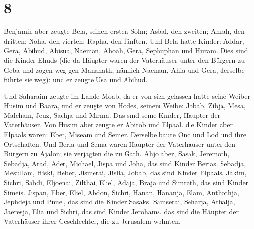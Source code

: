 \hypertarget{section-7}{%
\section{8}\label{section-7}}

 Benjamin aber zeugte Bela, seinen ersten Sohn; Asbal, den
zweiten; Ahrah, den dritten;  Noha, den vierten; Rapha, den
fünften.  Und Bela hatte Kinder: Addar, Gera, Abihud,
 Abisua, Naeman, Ahoah,  Gera, Sephuphan und
Huram.  Dies sind die Kinder Ehuds (die da Häupter waren der
Vaterhäuser unter den Bürgern zu Geba und zogen weg gen Manahath,
 nämlich Naeman, Ahia und Gera, derselbe führte sie weg):
und er zeugte Usa und Abihud.

 Und Saharaim zeugte im Lande Moab, da er von sich gelassen
hatte seine Weiber Husim und Baara,  und er zeugte von
Hodes, seinem Weibe: Jobab, Zibja, Mesa, Malcham,  Jeuz,
Sachja und Mirma. Das sind seine Kinder, Häupter der Vaterhäuser.
 Von Husim aber zeugte er Abitob und Elpaal. 
die Kinder aber Elpaals waren: Eber, Miseam und Semer. Derselbe baute
Ono und Lod und ihre Ortschaften.  Und Beria und Sema waren
Häupter der Vaterhäuser unter den Bürgern zu Ajalon; sie verjagten die
zu Gath.  Ahjo aber, Sasak, Jeremoth, 
Sebadja, Arad, Ader,  Michael, Jispa und Joha, das sind
Kinder Berias.  Sebadja, Mesullam, Hiski, Heber,
 Jismerai, Jislia, Jobab, das sind Kinder Elpaals.
 Jakim, Sichri, Sabdi,  Eljoenai, Zilthai,
Eliel,  Adaja, Braja und Simrath, das sind Kinder Simeis.
 Jispan, Eber, Eliel,  Abdon, Sichri, Hanan,
 Hananja, Elam, Anthothja,  Jephdeja und
Pnuel, das sind die Kinder Sasaks.  Samserai, Seharja,
Athalja,  Jaeresja, Elia und Sichri, das sind Kinder
Jerohams.  das sind die Häupter der Vaterhäuser ihrer
Geschlechter, die zu Jerusalem wohnten.

